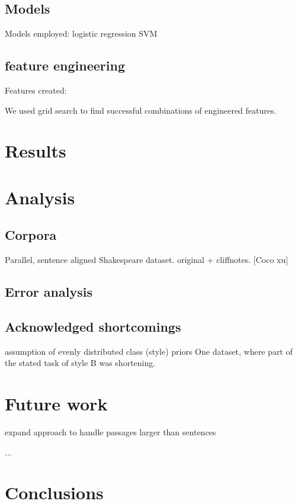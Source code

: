 \documentclass[letterpaper, 10 pt, conference]{ieeeconf}  %
\begin{document}
\subsection{Models}
Models employed:
logistic regression
SVM




\subsection{feature engineering}
Features created:


We used grid search to find successful combinations of engineered features.
  
\section{Results}

\section{Analysis}
  \subsection{Corpora}
    Parallel, sentence aligned Shakespeare dataset. original + cliffnotes. [Coco xu]
  \subsection{Error analysis}
  \subsection{Acknowledged shortcomings}
  assumption of evenly distributed class (style) priors
One dataset, where part of the stated task of style B was shortening.

\section{Future work}
expand approach to handle passages larger than sentences

...
\section{Conclusions}



\addtolength{\textheight}{-12cm}   %
\end{document}
